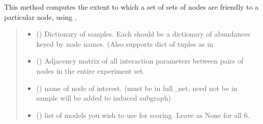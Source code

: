 \documentclass[letterpaper,10pt,english]{sphinxmanual}
\begin{document}
\begin{fulllineitems}
\label{\detokenize{scoring:score_net.network_friendliness}}
\pysigstartsignatures
{}
\pysigstopsignatures
\sphinxAtStartPar
This method computes the extent to which a set of sets of nodes are friendly to a particular node, using .
\begin{quote}\begin{description}
\begin{itemize}
\item {} 
\sphinxAtStartPar
{} (\sphinxstyleliteralemphasis{\sphinxupquote{{[}}}\sphinxstyleliteralemphasis{\sphinxupquote{{[}}}\sphinxstyleliteralemphasis{\sphinxupquote{{]}}}\sphinxstyleliteralemphasis{\sphinxupquote{{]}}}) \textendash{} Dictionary of samples. Each should be a dictionary of abundances keyed by node names. (Also supports dict of tuples as in {\hyperref[\detokenize{scoring:score_net.score_net}]{}}

\item {} 
\sphinxAtStartPar
{} () \textendash{} Adjacency matrix of all interaction parameters between pairs of nodes in the entire experiment set.

\item {} 
\sphinxAtStartPar
{} () \textendash{} name of node of interest. (must be in full\_net, need not be in sample \sphinxhyphen{} will be added to induced subgraph)

\item {} 
\sphinxAtStartPar
{} () \textendash{} list of models you wish to use for scoring. Leave as None for all 6.


\end{itemize}
\end{description}
\end{quote}
\end{fulllineitems}
\end{document}
